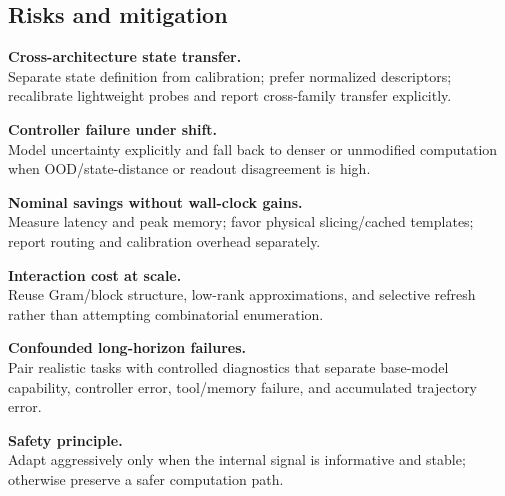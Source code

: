 \documentclass[12pt,a4paper]{article}
\begin{document}
\subsection{Risks and mitigation}
\label{sec:challenges}
\begin{tcbraster}[raster columns=2,raster equal height=rows,raster column skip=6pt,raster row skip=6pt]
\begin{tcolorbox}[colback=white,colframe=MidGray,boxrule=.4pt,arc=1.5pt]\small{}\raggedright
\textbf{Cross-architecture state transfer.}\\[-1mm]
\small Separate state definition from calibration; prefer normalized descriptors; recalibrate lightweight probes and report cross-family transfer explicitly.
\end{tcolorbox}
\begin{tcolorbox}[colback=white,colframe=MidGray,boxrule=.4pt,arc=1.5pt]\small{}\raggedright
\textbf{Controller failure under shift.}\\[-1mm]
\small Model uncertainty explicitly and fall back to denser or unmodified computation when OOD/state-distance or readout disagreement is high.
\end{tcolorbox}
\begin{tcolorbox}[colback=white,colframe=MidGray,boxrule=.4pt,arc=1.5pt]\small{}\raggedright
\textbf{Nominal savings without wall-clock gains.}\\[-1mm]
\small Measure latency and peak memory; favor physical slicing/cached templates; report routing and calibration overhead separately.
\end{tcolorbox}
\begin{tcolorbox}[colback=white,colframe=MidGray,boxrule=.4pt,arc=1.5pt]\small{}\raggedright
\textbf{Interaction cost at scale.}\\[-1mm]
\small Reuse Gram/block structure, low-rank approximations, and selective refresh rather than attempting combinatorial enumeration.
\end{tcolorbox}
\begin{tcolorbox}[colback=white,colframe=MidGray,boxrule=.4pt,arc=1.5pt]\small{}\raggedright
\textbf{Confounded long-horizon failures.}\\[-1mm]
\small Pair realistic tasks with controlled diagnostics that separate base-model capability, controller error, tool/memory failure, and accumulated trajectory error.
\end{tcolorbox}
\begin{tcolorbox}[colback=SoftRed!45,colframe=NTUred!45,boxrule=.4pt,arc=1.5pt]\small{}\raggedright
\textbf{Safety principle.}\\[-1mm]
\small Adapt aggressively only when the internal signal is informative and stable; otherwise preserve a safer computation path.
\end{tcolorbox}
\end{tcbraster}
\end{document}
